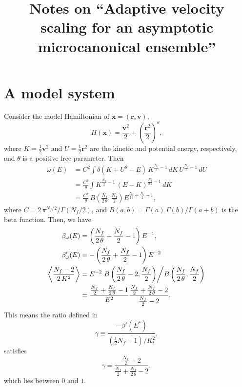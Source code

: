 \documentclass[preprint]{revtex4-1}
\begin{document}
\title{Notes on ``Adaptive velocity scaling for an asymptotic
microcanonical ensemble''}
\author{}

\maketitle



\section{\label{sec:model}A model system}




%
Consider the model Hamiltonian of $\mathbf x = (\mathbf r, \mathbf v)$,
\begin{equation}
  H(\mathbf x)
  =
  \frac{\mathbf v^2} { 2 }
  +
  \left( \frac{\mathbf r^2} { 2 } \right)^\theta
  ,
\end{equation}
%
where $K = \frac 1 2 {\mathbf v}^2$ and
$U = \frac 1 2 {\mathbf r}^2$
are the kinetic and potential energy, respectively,
and $\theta$ is a positive free parameter.
Then
\begin{align*}
  \omega(E)
  &=
  C^2
  \int
    \delta\left( K + U^\theta - E \right) \,
    K^{\frac{ N_f } 2 - 1} \, dK \, U^{\frac{ N_f } 2 - 1} \, dU
  \\
  &=
  \frac{ C^2 } { \theta }
  \int
  K^{\frac{ N_f } 2 - 1} \, (E - K)^{\frac{ N_f }{ 2 \, \theta } - 1}
    \, dK
  \\
  &=
  \frac{ C^2 }{ \theta } \,
  B\left( \frac{ N_f } {2 \, \theta}, \frac{ N_f } 2 \right)
  E^{ \frac{ N_f }{2 \, \theta} + \frac{N_f}{2} - 1 }
  ,
\end{align*}
where
%
$C = 2 \, \pi^{N_f/2} / \Gamma\left( N_f / 2 \right)$,
and
$B(a, b) = \Gamma(a) \, \Gamma(b) / \Gamma(a+b)$
is the beta function.
%
Then, we have
\begin{align*}
\beta_\omega(E)
&=
\left(
  \frac{ N_f } { 2 \, \theta } + \frac{ N_f } 2 - 1
\right)
E^{-1}
,
\\
\beta'_\omega(E)
&=
-
\left(
  \frac{ N_f } { 2 \, \theta } + \frac{ N_f } 2 - 1
\right)
E^{-2}
\\
\left\langle
  \frac{
    N_f - 2
  }
  {
    2 \, K^2
  }
\right\rangle
&=
  E^{-2}
\left.
  B\left( \frac{ N_f } { 2  \, \theta } - 2, \frac{ N_f } { 2 } \right)
\middle/
  B\left( \frac{ N_f } { 2  \, \theta }, \frac{ N_f } { 2 } \right)
\right.
\\
&=
\frac{ \frac{ N_f } 2 + \frac{ N_f }{2 \, \theta} - 1 }
     { E^2 }
\frac{ \frac{ N_f } 2 + \frac{ N_f }{2 \, \theta} - 2 }
     { \frac{ N_f } 2 - 2 }
.
\end{align*}
This means the ratio defined in
\begin{equation}
  \gamma
  \equiv
  \frac
  {
    -\beta'(E^*)
  }
  {
    \overline{
      \left( \frac 1 2 N_f - 1  \right) / K_t^2
    }
  }
  ,
  \label{eq:gamma_def}
\end{equation}
satisfies
$$
\gamma
=
\frac
{
  \frac{ N_f } 2 - 2
}
{
  \frac{ N_f } 2 + \frac{N_f}{2 \, \theta} - 2
}
,
$$
which lies between $0$ and $1$.
\end{document}
